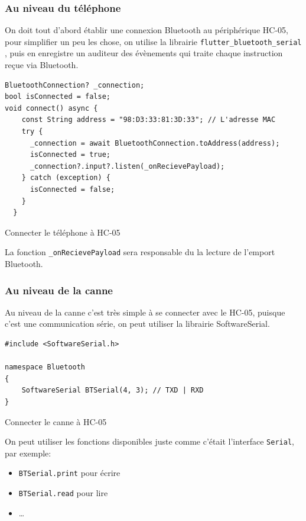 \subsubsection{Au niveau du téléphone}
On doit tout d'abord établir une connexion Bluetooth au périphérique HC-05, pour simplifier un peu les chose, on utilise la librairie \verb|flutter_bluetooth_serial| \cite{flutter_bluetooth_serial}, puis en enregistre un auditeur des évènements qui traite chaque instruction reçue via Bluetooth.

\begin{code}
\begin{verbatim}
BluetoothConnection? _connection;
bool isConnected = false;
void connect() async {
    const String address = "98:D3:33:81:3D:33"; // L'adresse MAC
    try {
      _connection = await BluetoothConnection.toAddress(address);
      isConnected = true;
      _connection?.input?.listen(_onRecievePayload);
    } catch (exception) {
      isConnected = false;
    }
  }
\end{verbatim}
\caption{Connecter le téléphone à HC-05}
\end{code}

La fonction \verb|_onRecievePayload| sera responsable du la lecture de l'emport Bluetooth.

\subsubsection{Au niveau de la canne}
Au niveau de la canne c'est très simple à se connecter avec le HC-05, puisque c'est une communication série, on peut utiliser la librairie SoftwareSerial.

\begin{code}
\begin{verbatim}
#include <SoftwareSerial.h>

namespace Bluetooth
{
    SoftwareSerial BTSerial(4, 3); // TXD | RXD
}
\end{verbatim}
\caption{Connecter le canne à HC-05}
\end{code}

On peut utiliser les fonctions disponibles juste comme c'était l'interface \verb|Serial|, par exemple:
\begin{itemize}
    \item \verb|BTSerial.print| pour écrire
    \item \verb|BTSerial.read| pour lire
    \item \dots
\end{itemize}

